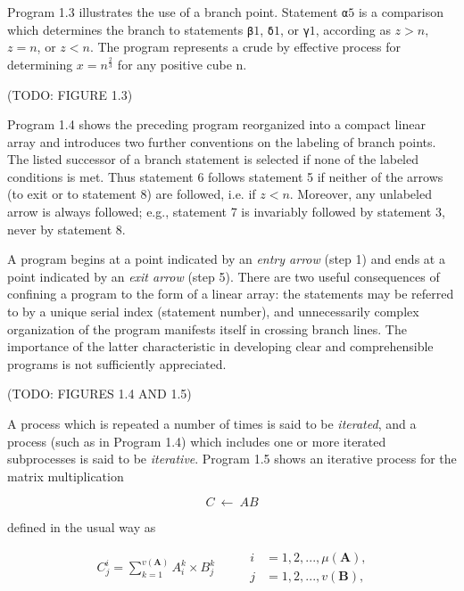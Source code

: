 \par Program 1.3 illustrates the use of a branch point. Statement \verb|α|$5$ is a comparison which determines the branch to statements \verb|β|$1$, \verb|δ|$1$, or \verb|γ|$1$, according as $z > n$, $z = n$, or $z < n$. The program represents a crude by effective process for determining $x = n^\frac{2}{3}$ for any positive cube n.

\par (TODO: FIGURE 1.3)

\par Program 1.4 shows the preceding program reorganized into a compact linear array and introduces two further conventions on the labeling of branch points. The listed successor of a branch statement is selected if none of the labeled conditions is met. Thus statement 6 follows statement 5 if neither of the arrows (to exit or to statement 8) are followed, i.e. if $z < n$. Moreover, any unlabeled arrow is always followed; e.g., statement 7 is invariably followed by statement 3, never by statement 8.

\par A program begins at a point indicated by an \textit{entry arrow} (step 1) and ends at a point indicated by an \textit{exit arrow} (step 5). There are two useful consequences of confining a program to the form of a linear array: the statements may be referred to by a unique serial index (statement number), and unnecessarily complex organization of the program manifests itself in crossing branch lines. The importance of the latter characteristic in developing clear and comprehensible programs is not sufficiently appreciated.

\par (TODO: FIGURES 1.4 AND 1.5)

\par A process which is repeated a number of times is said to be \textit{iterated}, and a process (such as in Program 1.4) which includes one or more iterated subprocesses is said to be \textit{iterative}. Program 1.5 shows an iterative process for the matrix multiplication

$$
      C\ ←\ AB
$$

\noindent defined in the usual way as

\begin{equation*}
  \begin{split}
    C^i_j = \sum^{v(\textbf{A})}_{k=1} A^k_i \times B^k_j
  \end{split}
\quad\quad
  \begin{split}
    i &= 1,2, ..., \mu(\textbf{A}),\\
    j &= 1,2, ..., v(\textbf{B}),
  \end{split}
\end{equation*}

